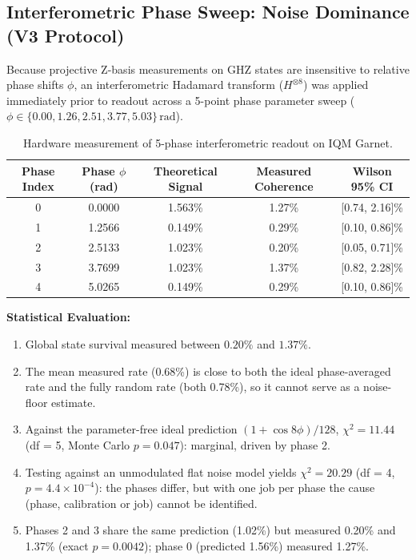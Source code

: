 \documentclass[11pt,a4paper]{article}
\begin{document}
\subsection{Interferometric Phase Sweep: Noise Dominance (V3 Protocol)}
Because projective Z-basis measurements on GHZ states are insensitive to relative phase shifts $\phi$, an interferometric Hadamard transform ($H^{\otimes 8}$) was applied immediately prior to readout across a 5-point phase parameter sweep ($\phi \in \{0.00, 1.26, 2.51, 3.77, 5.03\}\,\text{rad}$).

\begin{table}[htbp]
\centering
\begin{tabular}{ccccc}
\toprule
\textbf{Phase Index} & \textbf{Phase $\phi$ (rad)} & \textbf{Theoretical Signal} & \textbf{Measured Coherence} & \textbf{Wilson 95\% CI} \\
\midrule
0 & 0.0000 & 1.563\% & 1.27\% & [0.74, 2.16]\% \\
1 & 1.2566 & 0.149\% & 0.29\% & [0.10, 0.86]\% \\
2 & 2.5133 & 1.023\% & 0.20\% & [0.05, 0.71]\% \\
3 & 3.7699 & 1.023\% & 1.37\% & [0.82, 2.28]\% \\
4 & 5.0265 & 0.149\% & 0.29\% & [0.10, 0.86]\% \\
\bottomrule
\end{tabular}
\caption{Hardware measurement of 5-phase interferometric readout on IQM Garnet.}
\label{tab:iqm_sweep}
\end{table}

\noindent \textbf{Statistical Evaluation:}
\begin{enumerate}
  \item Global state survival measured between $0.20\%$ and $1.37\%$.
  \item The mean measured rate (0.68\%) is close to both the ideal phase-averaged rate and the fully random rate (both 0.78\%), so it cannot serve as a noise-floor estimate.
  \item Against the parameter-free ideal prediction $(1+\cos 8\phi)/128$, $\chi^2 = 11.44$ (df = 5, Monte Carlo $p = 0.047$): marginal, driven by phase 2.
  \item Testing against an unmodulated flat noise model yields $\chi^2 = 20.29$ (df = 4, $p = 4.4\times10^{-4}$): the phases differ, but with one job per phase the cause (phase, calibration or job) cannot be identified.
  \item Phases 2 and 3 share the same prediction (1.02\%) but measured 0.20\% and 1.37\% (exact $p = 0.0042$); phase 0 (predicted 1.56\%) measured 1.27\%.
\end{enumerate}
\end{document}
